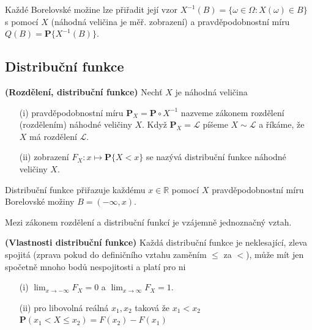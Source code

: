 Každé Borelovské možine lze přiřadit její vzor $X^{-1}(B) = \lbrace \omega \in \Omega : X(\omega) \in B \rbrace$ s pomocí $X$ (náhodná veličina je měř. zobrazení) a pravděpodobnostní míru $Q(B) = \textbf{P}\lbrace X^{-1}(B) \rbrace$.



\subsection{Distribuční funkce}
\begin{definition}{\textbf{(Rozdělení, distribuční funkce)}}
Nechť $X$ je náhodná veličina
\begin{itemize}
\item[(i)] pravděpodobnostní míru $\textbf{P}_{X} = \textbf{P} \circ X^{-1}$ nazveme zákonem rozdělení (rozdělením) náhodné veličiny $X$. Když $\textbf{P}_{X} = \mathcal{L}$ píšeme $X \sim \mathcal{L}$ a říkáme, že $X$ má rozdělení $\mathcal{L}$.
\item[(ii)] zobrazení $F_{X}: x \mapsto \textbf{P}\lbrace X < x \rbrace$ se nazývá distribuční funkce náhodné veličiny $X$.
\end{itemize}
\end{definition}
\begin{remark}
Distribuční funkce přiřazuje každému $x \in \mathbb{R}$ pomocí $X$ pravděpodobnostní míru Borelovské možiny $B = ( -\infty, x)$. 

Mezi zákonem rozdělení a distribuční funkcí je vzájemně jednoznačný vztah.
\end{remark}
\begin{remark}{\textbf{(Vlastnosti distribuční funkce)}}
Každá distribuční funkce je neklesající, zleva spojitá (zprava pokud do definičního vztahu zaměním $\leq$ za $<$), může mít jen spočetně mnoho bodů nespojitosti a platí pro ni
\begin{itemize}
\item[(i)] $\lim_{x \longrightarrow -\infty}F_{X} = 0$ a $\lim_{x \longrightarrow \infty}F_{X} = 1$.
\item[(ii)]pro libovolná reálná $x_{1}, x_{2}$ taková že $x_{1} < x_{2}$ $\textbf{P}(x_{1} < X \leq x_{2}) = F(x_{2}) - F(x_{1})$
\end{itemize} 
\end{remark}

